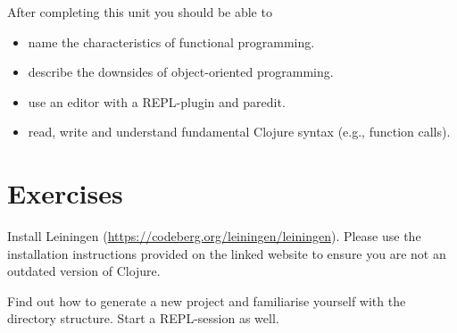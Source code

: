 \documentclass[11pt,a4paper]{article}
\begin{document}
	After completing this unit you should be able to
	
	\begin{itemize}
		\item name the characteristics of functional programming.
		\item describe the downsides of object-oriented programming.
		\item use an editor with a REPL-plugin and paredit.
        \item read, write and understand fundamental Clojure syntax (e.g., function calls).
	\end{itemize}
	
	\section{Exercises}

	\begin{exercise}[Leiningen]
		Install Leiningen (\url{https://codeberg.org/leiningen/leiningen}).
		Please use the installation instructions provided on the linked website
		to ensure you are not an outdated version of Clojure.
		
		Find out how to generate a new project
		and familiarise yourself with the directory structure.
		Start a REPL-session as well.
	\end{exercise}
	
\end{document}
